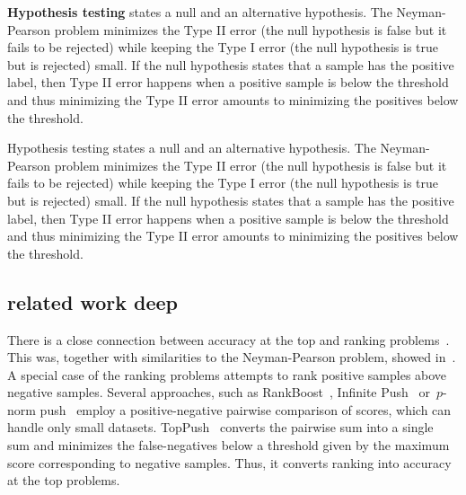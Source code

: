 
\textbf{Hypothesis testing} states a null and an alternative hypothesis. The Neyman-Pearson problem minimizes the Type II error (the null hypothesis is false but it fails to be rejected) while keeping the Type I error (the null hypothesis is true but is rejected) small. If the null hypothesis states that a sample has the positive label, then Type II error happens when a positive sample is below the threshold and thus minimizing the Type II error amounts to minimizing the positives below the threshold.

Hypothesis testing states a null and an alternative hypothesis. The Neyman-Pearson problem minimizes the Type II error (the null hypothesis is false but it fails to be rejected) while keeping the Type I error (the null hypothesis is true but is rejected) small. If the null hypothesis states that a sample has the positive label, then Type II error happens when a positive sample is below the threshold and thus minimizing the Type II error amounts to minimizing the positives below the threshold.

\subsection{related work deep}

There is a close connection between accuracy at the top and ranking problems~\cite{batmaz2019review,werner2019review}. This was, together with similarities to the Neyman-Pearson problem, showed in~\cite{adam2021general}. A special case of the ranking problems attempts to rank positive samples above negative samples. Several approaches, such as RankBoost~\cite{freund2003efficient}, Infinite Push~\cite{agarwal2011infinite} or~$p$-norm push~\cite{rudin2009pnorm} employ a positive-negative pairwise comparison of scores, which can handle only small datasets. TopPush~\cite{li2014top} converts the pairwise sum into a single sum and minimizes the false-negatives below a threshold given by the maximum score corresponding to negative samples. Thus, it converts ranking into accuracy at the top problems.

